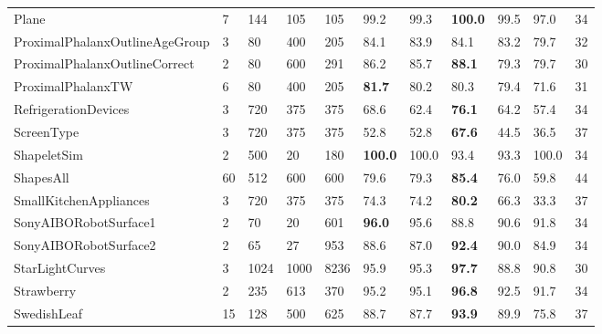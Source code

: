\documentclass[runningheads]{llncs}
\begin{document}
\begin{table}[t]
\begin{tabular}{>{\tiny}lllll|lllll|l}
		Plane                          & 7         & 144       & 105     & 105    & 99.2 & 99.3           & \textbf{100.0} & 99.5          & 97.0  & 34          \\
		ProximalPhalanxOutlineAgeGroup & 3         & 80        & 400     & 205    & 84.1 & 83.9          & 84.1           & 83.2          & 79.7  & 32          \\
		ProximalPhalanxOutlineCorrect  & 2         & 80        & 600     & 291    & 86.2 & 85.7          & \textbf{88.1}  & 79.3          & 79.7  & 30          \\
		ProximalPhalanxTW              & 6         & 80        & 400     & 205    & \textbf{81.7} & 80.2  & 80.3           & 79.4          & 71.6  & 31          \\
		RefrigerationDevices           & 3         & 720       & 375     & 375    & 68.6 & 62.4           & \textbf{76.1}  & 64.2          & 57.4  & 34          \\
		ScreenType                     & 3         & 720       & 375     & 375    & 52.8 & 52.8          & \textbf{67.6}  & 44.5          & 36.5  & 37          \\
		ShapeletSim                    & 2         & 500       & 20      & 180    & \textbf{100.0} & 100.0 & 93.4           & 93.3          & 100.0 & 34          \\
		ShapesAll                      & 60        & 512       & 600     & 600    & 79.6 & 79.3           & \textbf{85.4}  & 76.0          & 59.8  & 44          \\
		SmallKitchenAppliances         & 3         & 720       & 375     & 375    & 74.3 & 74.2          & \textbf{80.2}  & 66.3          & 33.3  & 37          \\
		SonyAIBORobotSurface1          & 2         & 70        & 20      & 601    & \textbf{96.0} & 95.6  & 88.8           & 90.6          & 91.8  & 34          \\
		SonyAIBORobotSurface2          & 2         & 65        & 27      & 953    & 88.6 & 87.0           & \textbf{92.4}  & 90.0          & 84.9  & 34          \\
		StarLightCurves                & 3         & 1024      & 1000    & 8236   & 95.9 & 95.3          & \textbf{97.7}  & 88.8          & 90.8  & 30          \\
		Strawberry                     & 2         & 235       & 613     & 370    & 95.2 & 95.1           & \textbf{96.8}  & 92.5          & 91.7  & 34          \\
		SwedishLeaf                    & 15        & 128       & 500     & 625    & 88.7 & 87.7          & \textbf{93.9}  & 89.9          & 75.8  & 37          \\

\end{tabular}
\end{table}
\end{document}
